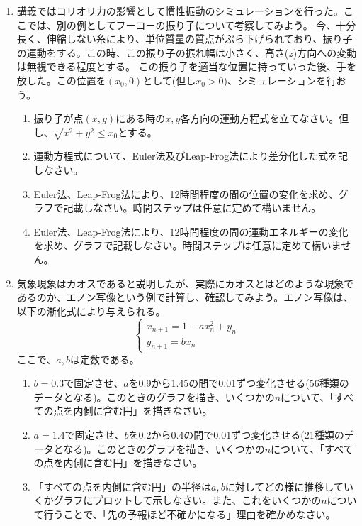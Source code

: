 \documentclass{jsarticle}
\newenvironment{problems}
{
  \renewcommand\labelenumi{\doublebox{\arabic{enumi}}}
  \begin{enumerate}
}{
  \end{enumerate}
  \renewcommand\labelenumi{\arabic{enumi}.}
}
\begin{document}
\begin{problems}
    \item 講義ではコリオリ力の影響として慣性振動のシミュレーションを行った。ここでは、別の例としてフーコーの振り子について考察してみよう。
    今、十分長く、伸縮しない糸により、単位質量の質点がぶら下げられており、振り子の運動をする。この時、この振り子の振れ幅は小さく、高さ($z$)方向への変動は無視できる程度とする。
    この振り子を適当な位置に持っていった後、手を放した。この位置を$(x_0,0)$として(但し$x_0>0$)、シミュレーションを行おう。
    \begin{enumerate}[(1)]
    \item 振り子が点$(x,y)$にある時の$x,y$各方向の運動方程式を立てなさい。但し、$\sqrt{x^2+y^2}\le x_0$とする。
    \item 運動方程式について、Euler法及びLeap-Frog法により差分化した式を記しなさい。
    \item Euler法、Leap-Frog法により、12時間程度の間の位置の変化を求め、グラフで記載しなさい。時間ステップは任意に定めて構いません。
    \item Euler法、Leap-Frog法により、12時間程度の間の運動エネルギーの変化を求め、グラフで記載しなさい。時間ステップは任意に定めて構いません。\\
    \end{enumerate}

    \item 気象現象はカオスであると説明したが、実際にカオスとはどのような現象であるのか、エノン写像という例で計算し、確認してみよう。エノン写像は、以下の漸化式により与えられる。
    \[
    \left\{
    \begin{array}{l}
    x_{n+1}=1-ax_n^2+y_n \\
    y_{n+1}=bx_n
    \end{array}
    \right.
    \]
    ここで、$a,b$は定数である。
    \begin{enumerate}[(1)]
    \item $b=0.3$で固定させ、$a$を0.9から1.45の間で0.01ずつ変化させる(56種類のデータとなる)。このときのグラフを描き、いくつかの$n$について、「すべての点を内側に含む円」を描きなさい。
    \item $a=1.4$で固定させ、$b$を0.2から0.4の間で0.01ずつ変化させる(21種類のデータとなる)。このときのグラフを描き、いくつかの$n$について、「すべての点を内側に含む円」を描きなさい。
    \item 「すべての点を内側に含む円」の半径は$a,b$に対してどの様に推移していくかグラフにプロットして示しなさい。また、これをいくつかの$n$について行うことで、「先の予報ほど不確かになる」理由を確かめなさい。
    \end{enumerate}

\end{problems}
\end{document}

